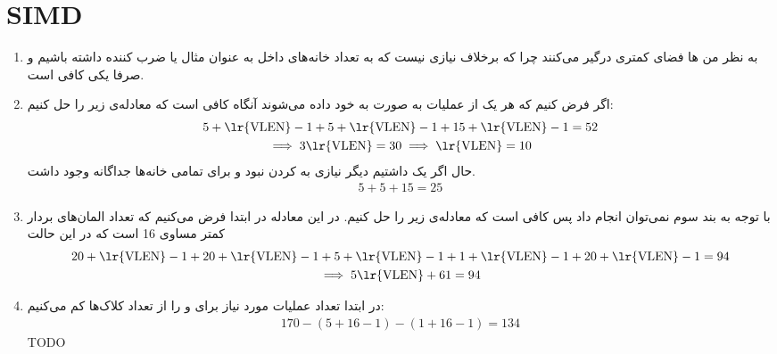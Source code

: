 \section{SIMD}
\begin{enumerate}
    \item به نظر من ها فضای کمتری درگیر می‌کنند
    چرا که برخلاف  نیازی نیست که
    به تعداد خانه‌های داخل
    به عنوان مثال
     یا ضرب کننده
    داشته باشیم و صرفا یکی کافی است.
    \item اگر فرض کنیم که هر یک از عملیات به صورت
    به خود
    داده می‌شوند آنگاه کافی است که معادله‌ی زیر را حل کنیم:
    \begin{gather*}
        5 + \text{\lr{VLEN}} - 1 + 5 + \text{\lr{VLEN}} - 1 + 15 + \text{\lr{VLEN}} - 1 = 52\\
        \implies 3 \text{\lr{VLEN}} = 30 \implies \text{\lr{VLEN}} = 10
    \end{gather*}
    حال اگر یک
    داشتیم دیگر نیازی به
    کردن نبود و برای تمامی خانه‌ها
    جداگانه وجود داشت.
    \begin{gather*}
        5 + 5 + 15 = 25
    \end{gather*}
    \item با توجه به بند سوم نمی‌توان  انجام داد پس کافی است که معادله‌ی زیر را حل کنیم.
    در این معادله در ابتدا فرض می‌کنیم که تعداد المان‌های بردار کمتر مساوی 16 است که در این حالت
    \begin{gather*}
        20 + \text{\lr{VLEN}} - 1 + 20 + \text{\lr{VLEN}} - 1 + 5 + \text{\lr{VLEN}} - 1 + 1 + \text{\lr{VLEN}} - 1 + 20 + \text{\lr{VLEN}} - 1 = 94\\
        \implies 5 \text{\lr{VLEN}} + 61 = 94
    \end{gather*}
    \item در ابتدا تعداد عملیات مورد نیاز برای
     و 
    را از تعداد کلاک‌ها کم می‌کنیم:
    \begin{gather*}
        170 - (5 + 16 - 1) - (1 + 16 - 1) = 134
    \end{gather*}
    TODO
\end{enumerate}